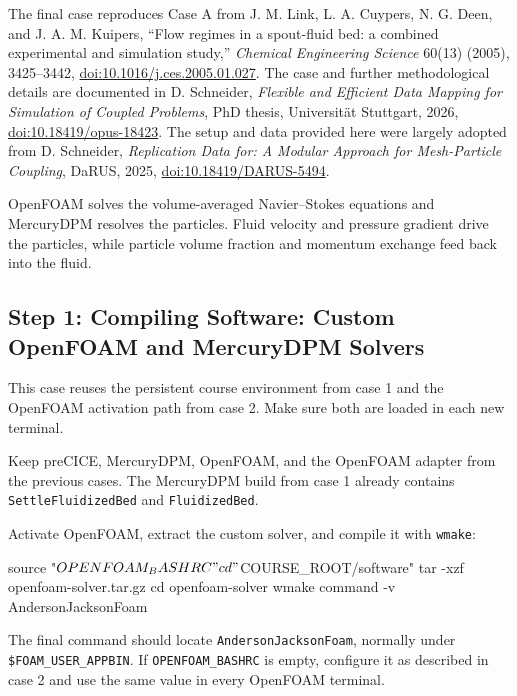 The final case reproduces Case A from J. M. Link, L. A. Cuypers, N. G.
Deen, and J. A. M. Kuipers, ``Flow regimes in a spout-fluid bed: a
combined experimental and simulation study,'' \emph{Chemical Engineering
Science} 60(13) (2005), 3425--3442,
\href{https://doi.org/10.1016/j.ces.2005.01.027}{doi:10.1016/j.ces.2005.01.027}.
The case and further methodological details are documented in D.
Schneider, \emph{Flexible and Efficient Data Mapping for Simulation of
Coupled Problems}, PhD thesis, Universität Stuttgart, 2026,
\href{https://doi.org/10.18419/opus-18423}{doi:10.18419/opus-18423}. The
setup and data provided here were largely adopted from D. Schneider,
\emph{Replication Data for: A Modular Approach for Mesh-Particle
Coupling}, DaRUS, 2025,
\href{https://doi.org/10.18419/DARUS-5494}{doi:10.18419/DARUS-5494}.

OpenFOAM solves the volume-averaged Navier--Stokes equations and
MercuryDPM resolves the particles. Fluid velocity and pressure gradient
drive the particles, while particle volume fraction and momentum
exchange feed back into the fluid.

\subsection{Step 1: Compiling Software: Custom OpenFOAM and MercuryDPM
Solvers}\label{03-link-fluidized-bed__readmemd__step-1-compiling-software-custom-openfoam-and-mercurydpm-solvers}

This case reuses the persistent course environment from case 1 and the
OpenFOAM activation path from case 2. Make sure both are loaded in each
new terminal.

Keep preCICE, MercuryDPM, OpenFOAM, and the OpenFOAM adapter from the
previous cases. The MercuryDPM build from case 1 already contains
\nolinkurl{SettleFluidizedBed} and \nolinkurl{FluidizedBed}.

Activate OpenFOAM, extract the custom solver, and compile it with
\nolinkurl{wmake}:

\noindent\begin{minipage}{\linewidth}
\begin{CourseCode}
source "$OPENFOAM_BASHRC"
cd "$COURSE_ROOT/software"
tar -xzf openfoam-solver.tar.gz
cd openfoam-solver
wmake
command -v AndersonJacksonFoam
\end{CourseCode}
\end{minipage}

The final command should locate \nolinkurl{AndersonJacksonFoam},
normally under \nolinkurl{$FOAM_USER_APPBIN}. If
\nolinkurl{OPENFOAM_BASHRC} is empty, configure it as described in case
2 and use the same value in every OpenFOAM terminal.

